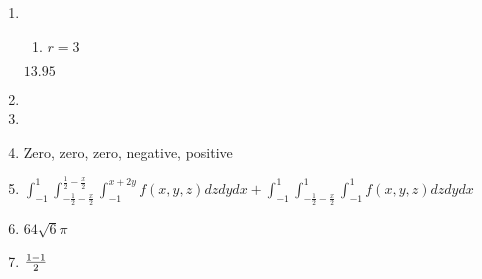 \documentclass[12pt]{article}
\let\cos\relax\DeclareMathOperator{\cos}{\mathsf{cos}}
\begin{document}
\begin{enumerate}
\item
\begin{enumerate}
\item $r=3$
\end{enumerate}
$13.95$
\item
\item
\item Zero, zero, zero, negative, positive
\item $\int_{-1}^1\int_{-\frac{1}{2}-\frac{x}{2}}
^{\frac{1}{2}-\frac{x}{2}}\int_{-1}^{x+2y}
f\left(x,y,z\right)dzdydx
+\int_{-1}^1\int_{-\frac{1}{2}-\frac{x}{2}}
^1\int_{-1}^1
f\left(x,y,z\right)dzdydx$
\item $64\sqrt{6}\pi$
\item $\frac{1-\cos{1}}{2}$
\end{enumerate}
\end{document}
